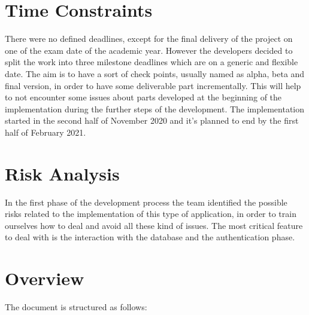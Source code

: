 	\section{Time Constraints}
		There were no defined deadlines, except for the final delivery of the project on one of the exam date of the academic year.
		However the developers decided to split the work into three milestone deadlines which are on a generic and flexible date. 
		The aim is to have a sort of check points, usually named as alpha, beta and final version, in order to have some deliverable part incrementally.
		This will help to not encounter some issues about parts developed at the beginning of the implementation during the further steps of the development.
		The implementation started in the second half of November 2020 and it's planned to end by the first half of February 2021.


	\section{Risk Analysis}
		In the first phase of the development process the team identified the possible risks related to the implementation of this type of application, in order to train ourselves how to deal and avoid all these kind of issues.
		The most critical feature to deal with is the interaction with the database and the authentication phase.


	\section{Overview}
		The document is structured as follows:

